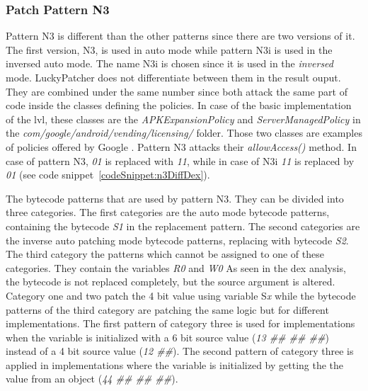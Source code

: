 \subsubsection{Patch Pattern N3}
Pattern N3 is different than the other patterns since there are two versions of it.
The first version, N3, is used in auto mode while pattern N3i is used in the inversed auto mode.
The name N3i is chosen since it is used in the \textit{inversed} mode.
LuckyPatcher does not differentiate between them in the result ouput.
They are combined under the same number since both attack the same part of code inside the classes defining the policies.
In case of the basic implementation of the \gls{lvl}, these classes are the \textit{APKExpansionPolicy} and \textit{ServerManagedPolicy} in the  \textit{com/google/android/vending/licensing/} folder.
Those two classes are examples of policies offered by Google \cite{developersLicensingReference}.
Pattern N3 attacks their \textit{allowAccess()} method.
\newline
In case of pattern N3, \textit{01} is replaced with \textit{11}, while in case of N3i \textit{11} is replaced by \textit{01} (see code snippet~\ref{codeSnippet:n3DiffDex}).
\newline

The bytecode patterns that are used by pattern N3.
They can be divided into three categories.
The first categories are the auto mode bytecode patterns, containing the bytecode \textit{S1} in the replacement pattern.
The second categories are the inverse auto patching mode bytecode patterns, replacing with bytecode \textit{S2}.
The third category the patterns which cannot be assigned to one of these categories.
They contain the variables \textit{R0} and \textit{W0}
\newline
As seen in the dex analysis, the bytecode is not replaced completely, but the source argument is altered.
Category one and two patch the 4 bit value using variable S\textit{x} while the bytecode patterns of the third category are patching the same logic but for different implementations.
The first pattern of category three is used for implementations when the variable is initialized  with a 6 bit source value (\textit{13 \#\# \#\# \#\#}) instead of a 4 bit source value (\textit{12 \#\#}).
The second pattern of category three is applied in implementations where the variable is initialized by getting the the value from an object (\textit{44 \#\# \#\# \#\#}).
